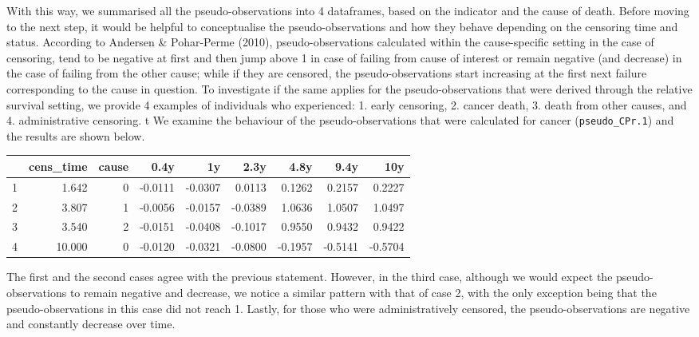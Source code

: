 \documentclass[a4paper,11pt]{article}\usepackage[]{graphicx}\usepackage[]{color}
\begin{document}
With this way, we summarised all the pseudo-observations into 4 dataframes, based on the indicator and the cause of death. Before moving to the next step, it would be helpful to conceptualise the pseudo-observations and how they  behave depending on the censoring time and status. According to Andersen \& Pohar-Perme (2010), pseudo-observations calculated within the cause-specific setting in the case of censoring, tend to be negative at first and then jump above 1 in case of failing from cause of interest or remain negative (and decrease) in the case of failing from the other cause; while if they are censored, the pseudo-observations start increasing at the first next failure corresponding to the cause in question. To investigate if the same applies for the pseudo-observations that were derived through the relative survival setting, we provide 4 examples of individuals who experienced: 1. early censoring, 2. cancer death, 3. death from other causes, and 4. administrative censoring. t We examine the behaviour of the pseudo-observations that were calculated for cancer (\texttt{pseudo\_CPr.1}) and the results are shown below. 

\begin{table}[ht]
\centering
\begin{tabular}{rrrrrrrrr}
  \hline
 & cens\_time & cause & 0.4y & 1y & 2.3y & 4.8y & 9.4y & 10y \\ 
  \hline
1 & 1.642 & 0 & -0.0111 & -0.0307 & 0.0113 & 0.1262 & 0.2157 & 0.2227 \\ 
  2 & 3.807 & 1 & -0.0056 & -0.0157 & -0.0389 & 1.0636 & 1.0507 & 1.0497 \\ 
  3 & 3.540 & 2 & -0.0151 & -0.0408 & -0.1017 & 0.9550 & 0.9432 & 0.9422 \\ 
  4 & 10.000 & 0 & -0.0120 & -0.0321 & -0.0800 & -0.1957 & -0.5141 & -0.5704 \\ 
   \hline
\end{tabular}
\end{table}


The first and the second cases agree with the previous statement. However, in the third case, although we would expect the pseudo-observations to remain negative and decrease, we notice a similar pattern with that of case 2, with the only exception being that the pseudo-observations in this case did not reach 1. Lastly, for those who were administratively censored, the pseudo-observations are negative and constantly decrease over time. 
\end{document}
